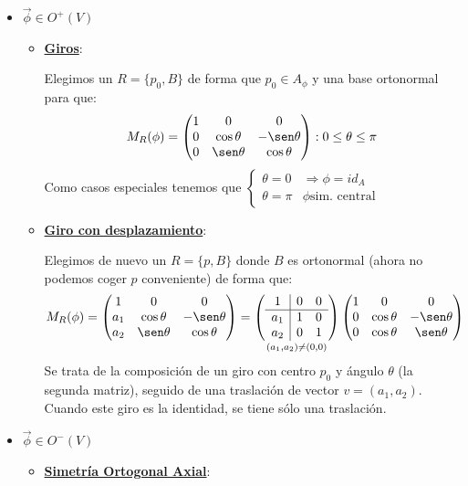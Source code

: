 \documentclass[10pt,a4paper,openright]{book}
\begin{document}
\begin{itemize}
\item $\vec{\phi} \in O^+(V)$
	\begin{itemize}
	\item \underline{\textbf{Giros}}: 
	
	Elegimos un $R=\{p_0, B\}$ de forma que $p_0\in A_\phi$ y una base ortonormal para que:
	$$M_R (\phi) = \begin{pmatrix} 1 & 0 & 0 \\ 0 & \cos\theta & -\sen\theta \\ 0 & \sen\theta & \cos\theta \\ \end{pmatrix} : 0 \leq \theta \leq \pi$$
 	Como casos especiales tenemos que $\begin{cases} \theta = 0  & \Rightarrow \phi = id_A  \\ \theta = \pi & \phi \mbox{sim. central}\end{cases}$

	\item \underline{\textbf{Giro con desplazamiento}}: 
	
	Elegimos de nuevo un $R=\{p, B\}$ donde $B$ es ortonormal (ahora no podemos coger $p$ conveniente) de forma que:
	$$M_R (\phi) = \begin{pmatrix} 1 & 0 & 0 \\ a_1 & \cos\theta & -\sen\theta \\ a_2 & \sen\theta & \cos\theta \\ \end{pmatrix} = \underset{(a_1, a_2) \neq (0,0)}{\left(\begin{array}{c|cc} 1 & 0  & 0  \\ \hline a_1 & 1 & 0 \\ a_2 & 0 & 1 \\ \end{array} \right) } \begin{pmatrix} 1 & 0 & 0 \\ 0 & \cos\theta & -\sen\theta \\ 0 & \cos\theta & \sen\theta \\ \end{pmatrix} $$	
	Se trata de la composición de un giro con centro $p_0$ y ángulo $\theta$ (la segunda matriz), seguido de una traslación de vector $v = (a_1,a_2)$. Cuando este giro es la identidad, se tiene sólo una traslación.

	\end{itemize}
\item $\vec{\phi} \in O^-(V)$
	\begin{itemize}
	\item \underline{\textbf{Simetría Ortogonal Axial}}: 
	

\end{itemize}
\end{itemize}
\end{document}
